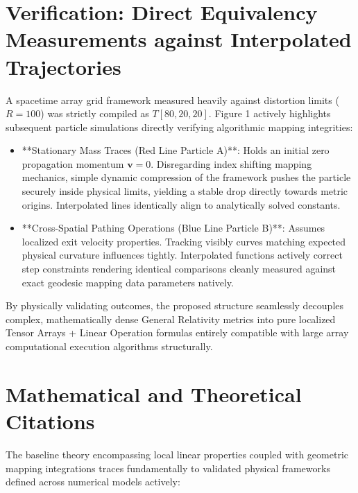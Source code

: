 \documentclass[11pt]{article}
\begin{document}
\section{Verification: Direct Equivalency Measurements against Interpolated Trajectories}

A spacetime array grid framework measured heavily against distortion limits ($R=100$) was strictly compiled as $T[80, 20, 20]$. Figure 1 actively highlights subsequent particle simulations directly verifying algorithmic mapping integrities:

\begin{itemize}
\item **Stationary Mass Traces (Red Line Particle A)**: Holds an initial zero propagation momentum $\mathbf{v}=0$. Disregarding index shifting mapping mechanics, simple dynamic compression of the framework pushes the particle securely inside physical limits, yielding a stable drop directly towards metric origins. Interpolated lines identically align to analytically solved constants.
\item **Cross-Spatial Pathing Operations (Blue Line Particle B)**: Assumes localized exit velocity properties. Tracking visibly curves matching expected physical curvature influences tightly. Interpolated functions actively correct step constraints rendering identical comparisons cleanly measured against exact geodesic mapping data parameters natively.

\end{itemize}
By physically validating outcomes, the proposed structure seamlessly decouples complex, mathematically dense General Relativity metrics into pure localized Tensor Arrays + Linear Operation formulas entirely compatible with large array computational execution algorithms structurally.

\section{Mathematical and Theoretical Citations}

The baseline theory encompassing local linear properties coupled with geometric mapping integrations traces fundamentally to validated physical frameworks defined across numerical models actively:
\end{document}
